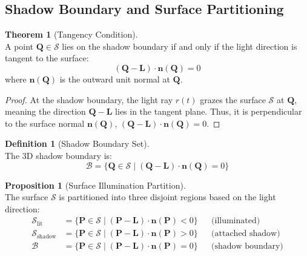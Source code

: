 \documentclass[12pt]{article}
\newcommand{\vect}[1]{\bm{#1}}
\theoremstyle{definition}
\newtheorem{definition}{Definition}[subsection]
\newtheorem{theorem}{Theorem}[subsection]
\newtheorem{proposition}{Proposition}[subsection]
\begin{document}
\subsection{Shadow Boundary and Surface Partitioning} \label{sec:shadow_boundary}

\begin{theorem}[Tangency Condition] \label{thm:tangency} ~\\
A point $\vect{Q} \in \mathcal{S}$ lies on the shadow boundary if and only if the light direction is tangent to the surface:
\begin{equation}
\boxed{(\vect{Q} - \vect{L}) \cdot \vect{n}(\vect{Q}) = 0} \label{eq:tangency}
\end{equation}
where $\vect{n}(\vect{Q})$ is the outward unit normal at $\vect{Q}$.
\end{theorem}

\begin{proof}
At the shadow boundary, the light ray $r(t)$ grazes the surface $\mathcal{S}$ at $\vect{Q}$, meaning the direction $\vect{Q} - \vect{L}$ lies in the tangent plane. Thus, it is perpendicular to the surface normal $\vect{n}(\vect{Q})$,  $(\vect{Q} - \vect{L}) \cdot \vect{n}(\vect{Q}) = 0$.
\end{proof}

\begin{definition}[Shadow Boundary Set] \label{def:boundary_set} ~\\
The 3D shadow boundary is:
\begin{equation}
\boxed{\mathcal{B} = \{\vect{Q} \in \mathcal{S} \mid (\vect{Q} - \vect{L}) \cdot \vect{n}(\vect{Q}) = 0\}} \label{eq:boundary_set}
\end{equation}
\end{definition}

\newpage

\begin{proposition}[Surface Illumination Partition] \label{prop:illumination_partition} ~\\
The surface $\mathcal{S}$ is partitioned into three disjoint regions based on the light direction:
\begin{align}
\mathcal{S}_{\text{lit}} &= \{\vect{P} \in \mathcal{S} \mid (\vect{P} - \vect{L}) \cdot \vect{n}(\vect{P}) < 0\} && \text{(illuminated)} \label{eq:lit_region} \\
\mathcal{S}_{\text{shadow}} &= \{\vect{P} \in \mathcal{S} \mid (\vect{P} - \vect{L}) \cdot \vect{n}(\vect{P}) > 0\} && \text{(attached shadow)} \label{eq:shadow_region} \\
\mathcal{B} &= \{\vect{P} \in \mathcal{S} \mid (\vect{P} - \vect{L}) \cdot \vect{n}(\vect{P}) = 0\} && \text{(shadow boundary)} \label{eq:boundary_region}
\end{align}
\end{proposition}
\end{document}
